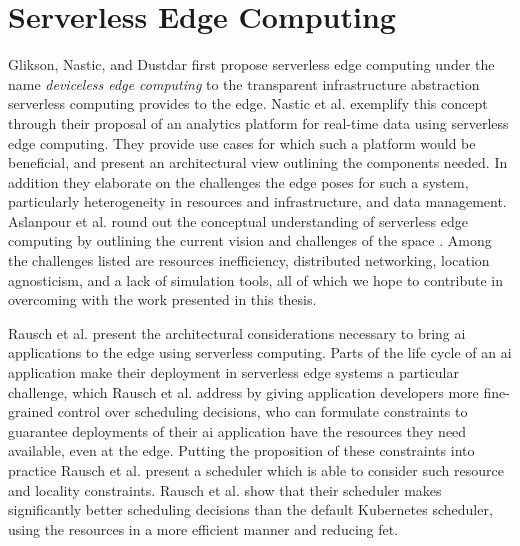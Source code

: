 \section{Serverless Edge Computing}
Glikson, Nastic, and Dustdar first propose serverless edge computing under the name \textit{deviceless edge computing} to the transparent infrastructure abstraction serverless computing provides to the edge\cite{gliksonDevicelessEdgeComputing2017}.
Nastic et al. exemplify this concept through their proposal of an analytics platform for real-time data using serverless edge computing\cite{nasticServerlessRealTimeData2017}.
They provide use cases for which such a platform would be beneficial, and present an architectural view outlining the components needed.
In addition they elaborate on the challenges the edge poses for such a system, particularly heterogeneity in resources and infrastructure, and data management\cite{nasticServerlessRealTimeData2017}.
Aslanpour et al. round out the conceptual understanding of serverless edge computing by outlining the current vision and challenges of the space \cite{aslanpourServerlessEdgeComputing2021}.
Among the challenges listed are resources inefficiency, distributed networking, location agnosticism, and a lack of simulation tools\cite{aslanpourServerlessEdgeComputing2021}, all of which we hope to contribute in overcoming with the work presented in this thesis.

Rausch et al.\cite{rauschServerlessPlatformEdge} present the architectural considerations necessary to bring \gls{ai} applications to the edge using serverless computing.
Parts of the life cycle of an \gls{ai} application make their deployment in serverless edge systems a particular challenge\cite{aslanpourServerlessEdgeComputing2021}, which Rausch et al. address by giving application developers more fine-grained control over scheduling decisions\cite{rauschServerlessPlatformEdge}, who can formulate constraints to guarantee deployments of their \gls{ai} application have the resources they need available, even at the edge.
Putting the proposition of these constraints into practice Rausch et al. present a scheduler which is able to consider such resource and locality constraints\cite{skippy}.
Rausch et al. show that their scheduler makes significantly better scheduling decisions than the default Kubernetes scheduler, using the resources in a more efficient manner and reducing \gls{fet}\cite{skippy}.

